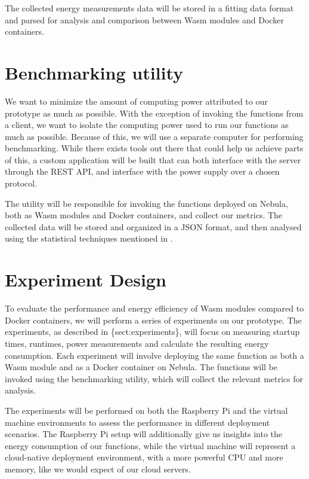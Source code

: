 \documentclass[
  table]{report}
\begin{document}
The collected energy measurements data will be stored in a fitting data
format and parsed for analysis and comparison between \ac{Wasm} modules
and Docker containers.

\section{Benchmarking utility}

We want to minimize the amount of computing power attributed to our
prototype as much as possible. With the exception of invoking the
functions from a client, we want to isolate the computing power used to
run our functions as much as possible. Because of this, we will use a
separate computer for performing benchmarking. While there exists tools
out there that could help us achieve parts of this, a custom application
will be built that can both interface with the server through the REST
API, and interface with the power supply over a chosen protocol.

The utility will be responsible for invoking the functions deployed on
Nebula, both as \ac{Wasm} modules and Docker containers, and collect our
metrics. The collected data will be stored and organized in a JSON
format, and then analysed using the statistical techniques mentioned in
.

\section{Experiment Design}

To evaluate the performance and energy efficiency of \ac{Wasm} modules
compared to Docker containers, we will perform a series of experiments
on our prototype. The experiments, as described in \{sect:experiments\},
will focus on measuring startup times, runtimes, power measurements and
calculate the resulting energy consumption. Each experiment will involve
deploying the same function as both a \ac{Wasm} module and as a Docker
container on Nebula. The functions will be invoked using the
benchmarking utility, which will collect the relevant metrics for
analysis.

The experiments will be performed on both the Raspberry Pi and the
virtual machine environments to assess the performance in different
deployment scenarios. The Raspberry Pi setup will additionally give us
insights into the energy consumption of our functions, while the virtual
machine will represent a cloud-native deployment environment, with a
more powerful CPU and more memory, like we would expect of our cloud
servers.
\end{document}
